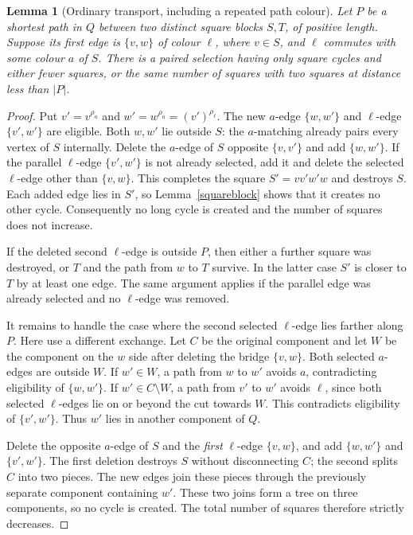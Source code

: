 \documentclass[11pt,a4paper]{article}
\newtheorem{lemma}[theorem]{Lemma}
\begin{document}
\begin{lemma}[Ordinary transport, including a repeated path colour]
\label{ordinary}
Let $P$ be a shortest path in $Q$ between two distinct square blocks
$S,T$, of positive length. Suppose its first edge is $\{v,w\}$ of
colour $\ell$, where $v\in S$, and $\ell$ commutes with some colour
$a$ of $S$. There is a paired selection having only square cycles
and either fewer squares, or the same number of squares with two
squares at distance less than $|P|$.
\end{lemma}
\begin{proof}
Put $v'=v^{\rho_a}$ and $w'=w^{\rho_a}=(v')^{\rho_\ell}$.
The new $a$-edge $\{w,w'\}$ and $\ell$-edge $\{v',w'\}$ are
eligible. Both $w,w'$ lie outside $S$: the $a$-matching already
pairs every vertex of $S$ internally. Delete the $a$-edge of $S$
opposite $\{v,v'\}$ and add $\{w,w'\}$. If the parallel
$\ell$-edge $\{v',w'\}$ is not already selected, add it and
delete the selected $\ell$-edge other than $\{v,w\}$.
This completes the square $S'=vv'w'w$ and destroys $S$.
Each added edge lies in $S'$, so Lemma~\ref{squareblock} shows
that it creates no other cycle. Consequently no long cycle is
created and the number of squares does not increase.

If the deleted second $\ell$-edge is outside $P$, then either a
further square was destroyed, or $T$ and the path from $w$ to $T$
survive. In the latter case $S'$ is closer to $T$ by at least one
edge. The same argument applies if the parallel edge was already
selected and no $\ell$-edge was removed.

It remains to handle the case where the second selected $\ell$-edge
lies farther along $P$. Here use a different exchange.
Let $C$ be the original component and let $W$ be the component on
the $w$ side after deleting the bridge $\{v,w\}$. Both selected
$a$-edges are outside $W$. If $w'\in W$, a path from $w$ to $w'$
avoids $a$, contradicting eligibility of $\{w,w'\}$. If
$w'\in C\setminus W$, a path from $v'$ to $w'$ avoids $\ell$,
since both selected $\ell$-edges lie on or beyond the cut towards
$W$. This contradicts eligibility of $\{v',w'\}$. Thus $w'$
lies in another component of $Q$.

Delete the opposite $a$-edge of $S$ and the \emph{first}
$\ell$-edge $\{v,w\}$, and add $\{w,w'\}$ and $\{v',w'\}$.
The first deletion destroys $S$ without disconnecting $C$; the
second splits $C$ into two pieces. The new edges join these pieces
through the previously separate component containing $w'$. These
two joins form a tree on three components, so no cycle is created.
The total number of squares therefore strictly decreases.
\end{proof}
\end{document}
